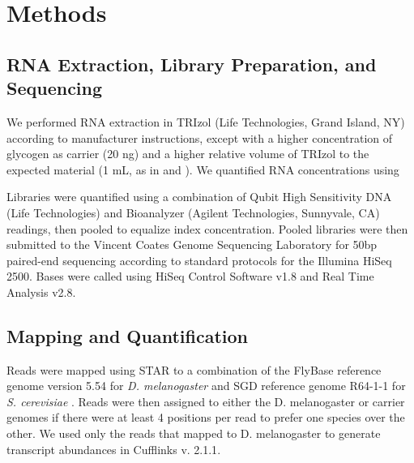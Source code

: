 \section{Methods}


\subsection{RNA Extraction, Library Preparation, and Sequencing}


We performed RNA extraction in TRIzol (Life Technologies, Grand Island, NY) according to manufacturer instructions, except with a higher concentration of glycogen as carrier (20 ng) and a higher relative volume of TRIzol to the expected material (1 mL, as in \cite{Lott:2011cc} and \cite{Combs:2013jy}). We quantified RNA concentrations using 


Libraries were quantified using a combination of Qubit High Sensitivity DNA (Life Technologies) and Bioanalyzer (Agilent Technologies, Sunnyvale, CA) readings, then pooled to equalize index concentration. Pooled libraries were then submitted to the Vincent Coates Genome Sequencing Laboratory for 50bp paired-end sequencing according to standard protocols for the Illumina HiSeq 2500. Bases were called using HiSeq Control Software v1.8 and Real Time Analysis v2.8.


\subsection{Mapping and Quantification}


Reads were mapped using STAR \cite{Dobin:2012fg} to a combination of the FlyBase reference genome version 5.54 for {\em D. melanogaster} and SGD reference genome R64-1-1 for {\em S. cerevisiae} \cite{McQuilton:2011iq,Cherry:2012kb}. Reads were then assigned to either the D. melanogaster or carrier genomes if there were at least 4 positions per read to prefer one species over the other. We used only the reads that mapped to D. melanogaster to generate transcript abundances in Cufflinks v. 2.1.1\cite{Roberts:2012kp}.
